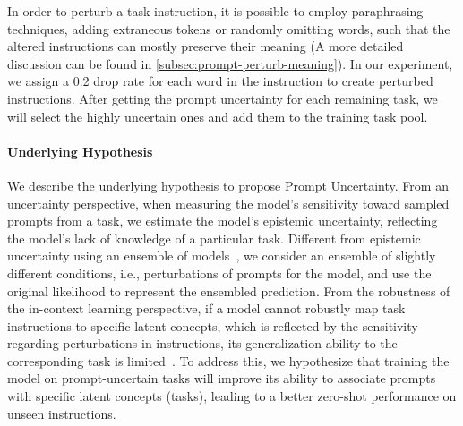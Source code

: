 In order to perturb a task instruction, it is possible to employ paraphrasing techniques, adding extraneous tokens or randomly omitting words, such that the altered instructions can mostly preserve their meaning (A more detailed discussion can be found in \autoref{subsec:prompt-perturb-meaning}).
In our experiment, we assign a 0.2 drop rate for each word in the instruction to create perturbed instructions. After getting the prompt uncertainty for each remaining task, we will select the highly uncertain ones and add them to the training task pool.

\paragraph{Underlying Hypothesis}
We describe the underlying hypothesis to propose Prompt Uncertainty.
From an uncertainty perspective, when measuring the model's sensitivity toward sampled prompts from a task, we estimate the model's epistemic uncertainty, reflecting the model's lack of knowledge of a particular task. Different from epistemic uncertainty using an ensemble of models~\citep{gal2016dropout}, we consider an ensemble of slightly different conditions, i.e., perturbations of prompts for the model, and use the original likelihood to represent the ensembled prediction. From the robustness of the in-context learning perspective, if a model cannot robustly map task instructions to specific latent concepts, which is reflected by the sensitivity regarding perturbations in instructions, its generalization ability to the corresponding task is limited~\cite{xie2021explanation, pan2023context}. 
To address this, we hypothesize that training the model on prompt-uncertain tasks will improve its ability to associate prompts with specific latent concepts (tasks), leading to a better zero-shot performance on unseen instructions.